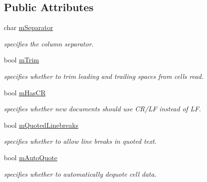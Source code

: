 \subsection*{Public Attributes}
\begin{DoxyCompactItemize}
\item 
\mbox{\label{structrapidcsv_1_1SeparatorParams_a8231e02d3e6b917675f30071d39eaebb}} 
char \hyperlink{structrapidcsv_1_1SeparatorParams_a8231e02d3e6b917675f30071d39eaebb}{m\+Separator}
\begin{DoxyCompactList}\small\item\em specifies the column separator. \end{DoxyCompactList}\item 
\mbox{\label{structrapidcsv_1_1SeparatorParams_a188b1488d2ef5f53e28b156dc9926695}} 
bool \hyperlink{structrapidcsv_1_1SeparatorParams_a188b1488d2ef5f53e28b156dc9926695}{m\+Trim}
\begin{DoxyCompactList}\small\item\em specifies whether to trim leading and trailing spaces from cells read. \end{DoxyCompactList}\item 
\mbox{\label{structrapidcsv_1_1SeparatorParams_a7f441773d773c69e1ed138164d3d1120}} 
bool \hyperlink{structrapidcsv_1_1SeparatorParams_a7f441773d773c69e1ed138164d3d1120}{m\+Has\+CR}
\begin{DoxyCompactList}\small\item\em specifies whether new documents should use C\+R/\+LF instead of LF. \end{DoxyCompactList}\item 
\mbox{\label{structrapidcsv_1_1SeparatorParams_a0d4cdda7636deba424ed2312fe3c87e0}} 
bool \hyperlink{structrapidcsv_1_1SeparatorParams_a0d4cdda7636deba424ed2312fe3c87e0}{m\+Quoted\+Linebreaks}
\begin{DoxyCompactList}\small\item\em specifies whether to allow line breaks in quoted text. \end{DoxyCompactList}\item 
\mbox{\label{structrapidcsv_1_1SeparatorParams_ae63043bd2471b4ab0c4af34ce042ac47}} 
bool \hyperlink{structrapidcsv_1_1SeparatorParams_ae63043bd2471b4ab0c4af34ce042ac47}{m\+Auto\+Quote}
\begin{DoxyCompactList}\small\item\em specifies whether to automatically dequote cell data. \end{DoxyCompactList}\end{DoxyCompactItemize}


